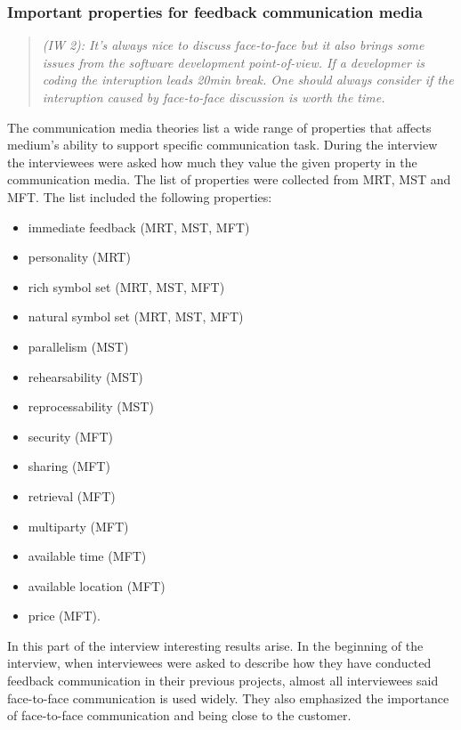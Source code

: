 \documentclass[english,12pt,a4paper,pdftex]{article}
\newcommand{\q}[2]{
\begin{quote}
\emph{(IW #1): #2}
\end{quote}}
\begin{document}
\subsubsection{Important properties for feedback communication media}

\q{2}{It's always nice to discuss face-to-face but it also brings some issues from the software development point-of-view. If a developmer is coding the interuption leads 20min break. One should always consider if the interuption caused by face-to-face discussion is worth the time.}

The communication media theories list a wide range of properties that affects medium's ability to support specific communication task. During the interview the interviewees were asked how much they value the given property in the communication media. The list of properties were collected from \ac{MRT}, \ac{MST} and \ac{MFT}. The list included the following properties:

\begin{itemize}
  \item immediate feedback (\acs{MRT}, \acs{MST}, \acs{MFT})
  \item personality (\acs{MRT})
  \item rich symbol set (\acs{MRT}, \acs{MST}, \acs{MFT})
  \item natural symbol set (\acs{MRT}, \acs{MST}, \acs{MFT})
  \item parallelism (\acs{MST})
  \item rehearsability (\acs{MST})
  \item reprocessability (\acs{MST})
  \item security (\acs{MFT})
  \item sharing (\acs{MFT})
  \item retrieval (\acs{MFT})
  \item multiparty (\acs{MFT})
  \item available time (\acs{MFT})
  \item available location (\acs{MFT})
  \item price (\acs{MFT}). 
\end{itemize}

In this part of the interview interesting results arise. In the beginning of the interview, when interviewees were asked to describe how they have conducted feedback communication in their previous projects, almost all interviewees said face-to-face communication is used widely. They also emphasized the importance of face-to-face communication and being close to the customer. 
\end{document}
